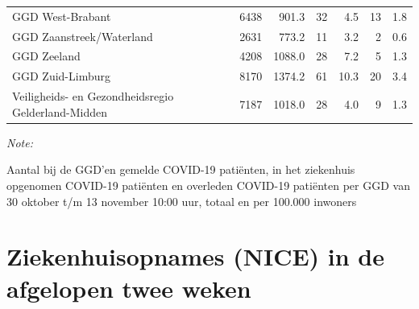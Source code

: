 \documentclass[
  english,
  man,floatsintext]{apa6}
\begin{document}
\begin{table}
\begin{threeparttable}
\begin{tabular}{lrrrrrr}
GGD West-Brabant & 6438 & 901.3 & 32 & 4.5 & 13 & 1.8\\
GGD Zaanstreek/Waterland & 2631 & 773.2 & 11 & 3.2 & 2 & 0.6\\
GGD Zeeland & 4208 & 1088.0 & 28 & 7.2 & 5 & 1.3\\
GGD Zuid-Limburg & 8170 & 1374.2 & 61 & 10.3 & 20 & 3.4\\
Veiligheids- en Gezondheidsregio Gelderland-Midden & 7187 & 1018.0 & 28 & 4.0 & 9 & 1.3\\
\bottomrule
\end{tabular}
\begin{tablenotes}
\item \textit{Note: } 
\item Aantal bij de GGD’en gemelde COVID-19 patiënten, in het ziekenhuis opgenomen COVID-19 patiënten en overleden COVID-19 patiënten per GGD van 30 oktober t/m 13 november 10:00 uur, totaal en per 100.000 inwoners
\end{tablenotes}
\end{threeparttable}
\endgroup{}
\end{table}

\newpage

\hypertarget{ziekenhuisopnames-nice-in-de-afgelopen-twee-weken}{%
\section{Ziekenhuisopnames (NICE) in de afgelopen twee weken}\label{ziekenhuisopnames-nice-in-de-afgelopen-twee-weken}}
\end{document}

